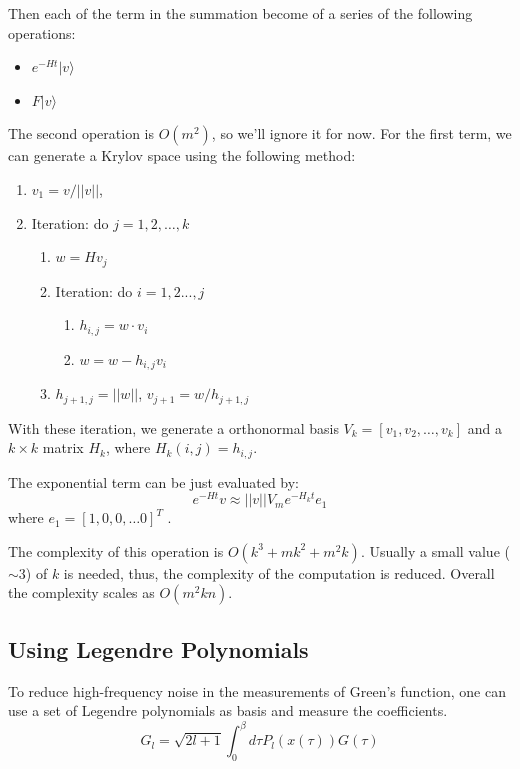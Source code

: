 Then each of the term in the summation become of a series of the following 
operations:
\begin{itemize}
\item $e^{-Ht}|v\rangle$
\item $F|v\rangle$
\end{itemize}

The second operation is $O(m^2)$, so we'll ignore it for now. For the first term,
we can generate a Krylov space using the following method: 
\begin{enumerate}
\item $v_1=v/||v||$,
\item Iteration: do $j=1,2,\ldots,k$ 
  \begin{enumerate}
  \item $w=Hv_j$
  \item Iteration: do $i=1,2...,j$
    \begin{enumerate}
    \item $h_{i,j}=w\cdot v_i$
    \item $w=w-h_{i,j}v_i$
    \end{enumerate}
  \item  $h_{j+1,j}=||w||$, $v_{j+1}=w/h_{j+1,j}$
  \end{enumerate}

\end{enumerate}

With these iteration, we generate a orthonormal basis 
$V_k=[v_1,v_2,\ldots, v_k]$
and a $k\times k$ matrix $H_k$, where $H_k(i,j)=h_{i,j}$.

The exponential term can be just evaluated by:
\[
e^{-Ht}v \approx ||v|| V_m e^{-H_k t}e_1
\]
where $e_1 = [1, 0, 0, \ldots 0]^T$ . 

The complexity of this operation is $O(k^3+mk^2+m^2k)$. Usually a small value ($\sim 3$)
of $k$ is needed, thus, the complexity of the computation is reduced. 
Overall the complexity scales as $O(m^2kn)$.


\subsection{Using Legendre Polynomials}

To reduce high-frequency noise in the measurements of Green's function, 
one can use a set of Legendre polynomials as basis and measure the coefficients. 
\[
G_l=\sqrt{2l+1}\int_0^\beta d\tau P_l(x(\tau))G(\tau)
\]

